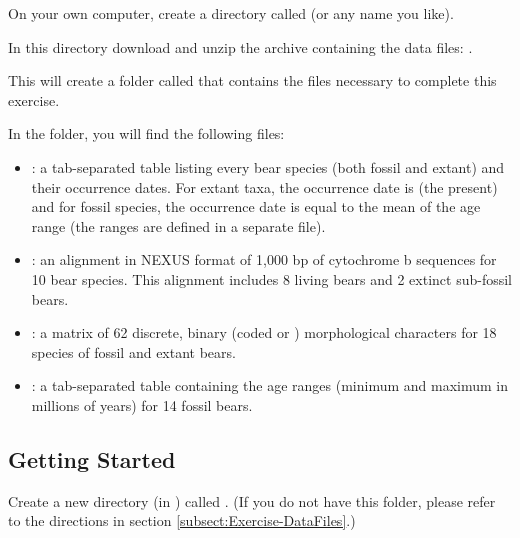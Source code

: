 {\begin{framed}
On your own computer, create a directory called {\textcolor{red}{}} (or any name you like). 

In this directory download and unzip the archive containing the data files: \href{https://github.com/revbayes/revbayes_tutorial/raw/master/RB_TotalEvidenceDating_FBD_Tutorial/data.zip}{}.

This will create a folder called  that contains the files necessary to complete this exercise.
\end{framed}}


In the  folder, you will find the following files:
\begin{itemize}[noitemsep,topsep=0pt]
\item {}: a tab-separated table listing every bear species (both fossil and extant) and their occurrence dates. For extant taxa, the occurrence date is  (\IE the present) and for fossil species, the occurrence date is equal to the mean of the age range (the ranges are defined in a separate file).
\item {}: an alignment in NEXUS format of 1,000 bp of cytochrome b sequences for 10 bear species. This alignment includes 8 living bears and 2 extinct sub-fossil bears.
\item {}: a matrix of 62 discrete, binary (coded  or ) morphological characters for 18 species of fossil and extant bears.
\item {}: a tab-separated table containing the age ranges (minimum and maximum in millions of years) for 14 fossil bears.
\end{itemize}

\bigskip
\subsection{Getting Started}\label{subsect:Exercise-GetStart}

{\begin{framed}
Create a new directory (in ) called {\textcolor{red}{}}. (If you do not have this folder, please refer to the directions in section \ref{subsect:Exercise-DataFiles}.)
\end{framed}}

